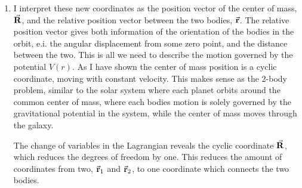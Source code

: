 \documentclass[11pt,a4paper]{report}
\newcounter{excount}[chapter]
\newenvironment{exercise}[1][]{\addtocounter{excount}{1} \noindent {\bf Problem
    \arabic{excount} \ \ #1}\hspace{2mm}}{\vspace{4mm}}
\begin{document}
\begin{multicols}{2}
\begin{exercise}
\begin{enumerate}[\bf a)]
\item I interpret these new coordinates as the position vector of the center of mass, $\va{R}$, and the relative position vector between the two bodies, $\va{r}$. The relative position vector gives both information of the orientation of the bodies in the orbit, e.i. the angular displacement from some zero point, and the distance between the two. This is all we need to describe the motion governed by the potential $V(r)$. As I have shown the center of mass position is a cyclic coordinate, moving with constant velocity. This makes sense as the 2-body problem, similar to the solar system where each planet orbits around the common center of mass, where each bodies motion is solely governed by the gravitational potential in the system, while the center of mass moves through the galaxy.

The change of variables in the Lagrangian reveals the cyclic coordinate $\va{R}$, which reduces the degrees of freedom by one. This reduces the amount of coordinates from two, $\va{r}_1$ and $\va{r}_2$, to one coordinate which connects the two bodies.
\end{enumerate}
\end{exercise}

\end{multicols}
\end{document}
